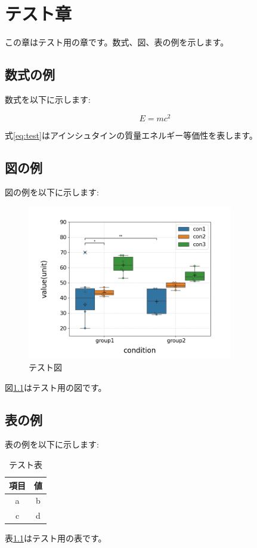 \chapter{テスト章}

この章はテスト用の章です。数式、図、表の例を示します\cite{example}。

\section{数式の例}

数式を以下に示します:

\begin{equation}
    \label{eq:test}
    E = mc^2
\end{equation}

式\eqref{eq:test}はアインシュタインの質量エネルギー等価性を表します。

\section{図の例}

図の例を以下に示します:

\begin{figure}[H]
    \centering
    \includegraphics[width=0.8\textwidth]{figures/test/test.png} %
    \caption{テスト図}
    \label{fig:test}
\end{figure}

図\ref{fig:test}はテスト用の図です。

\section{表の例}

表の例を以下に示します:

\begin{table}[H]
    \centering
    \caption{テスト表}
    \label{tab:test}
    \begin{tabular}{|c|c|}
        \hline
        項目 & 値 \\
        \hline
        a  & b \\
        c  & d \\
        \hline
    \end{tabular}
\end{table}

表\ref{tab:test}はテスト用の表です。
